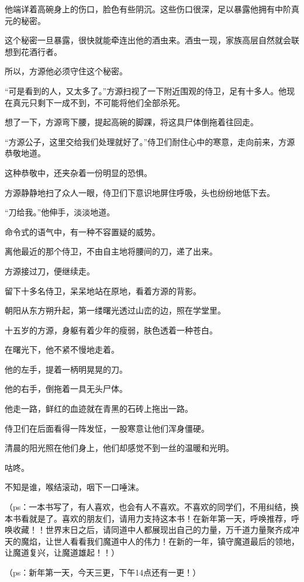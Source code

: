 \begin{this_body}
他端详着高碗身上的伤口，脸色有些阴沉。这些伤口很深，足以暴露他拥有中阶真元的秘密。

这个秘密一旦暴露，很快就能牵连出他的酒虫来。酒虫一现，家族高层自然就会联想到花酒行者。

所以，方源他必须守住这个秘密。

“可是看到的人，又太多了。”方源扫视了一下附近围观的侍卫，足有十多人。他现在真元只剩下一成不到，不可能将他们全部杀死。

想了一下，方源弯下腰，提起高碗的脚踝，将这具尸体倒拖着往回走。

“方源公子，这里交给我们处理就好了。”侍卫们耐住心中的寒意，走向前来，方源恭敬地道。

这种恭敬中，还夹杂着一份明显的恐惧。

方源静静地扫了众人一眼，侍卫们下意识地屏住呼吸，头也纷纷地低下去。

“刀给我。”他伸手，淡淡地道。

命令式的语气中，有一种不容置疑的威势。

离他最近的那个侍卫，不由自主地将腰间的刀，递了出来。

方源接过刀，便继续走。

留下十多名侍卫，呆呆地站在原地，看着方源的背影。

朝阳从东方朔升起，第一缕曙光透过山峦的边，照在学堂里。

十五岁的方源，身躯有着少年的瘦弱，肤色透着一种苍白。

在曙光下，他不紧不慢地走着。

他的左手，提着一柄明晃晃的刀。

他的右手，倒拖着一具无头尸体。

他走一路，鲜红的血迹就在青黑的石砖上拖出一路。

侍卫们在后面看得一阵发怔，一股寒意让他们浑身僵硬。

清晨的阳光照在他们身上，他们却感觉不到一丝的温暖和光明。

咕咚。

不知是谁，喉结滚动，咽下一口唾沫。

（ps：一本书写了，有人喜欢，也会有人不喜欢。不喜欢的同学们，不用纠结，换本书看就是了。喜欢的朋友们，请用力支持这本书！在新年第一天，呼唤推荐，呼唤收藏！！世界末日之后，请同道中人都展现出自己的力量，万千道力量聚齐成冲天的魔焰，让世人看看我们魔道中人的伟力！在新的一年，镇守魔道最后的领地，让魔道复兴，让魔道雄起！！）

（ps：新年第一天，今天三更，下午14点还有一更！）

\end{this_body}

